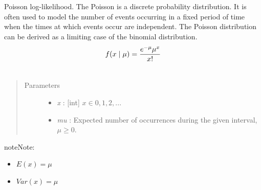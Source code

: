 \documentclass[letterpaper,10pt,english]{sphinxmanual}
\begin{document}
\begin{fulllineitems}
\label{distributions:pymc.distributions.poisson_like}
Poisson log-likelihood. The Poisson is a discrete probability
distribution.  It is often used to model the number of events
occurring in a fixed period of time when the times at which events
occur are independent. The Poisson distribution can be derived as
a limiting case of the binomial distribution.
\begin{gather}
\begin{split}f(x \mid \mu) = \frac{e^{-\mu}\mu^x}{x!}\end{split}\notag\\\begin{split}\end{split}\notag
\end{gather}\begin{quote}\begin{description}
\item[{Parameters }] \leavevmode\begin{itemize}
\item {} 
\emph{x} : {[}int{]} $x \in {0,1,2,...}$

\item {} 
\emph{mu} : Expected number of occurrences during the given interval, $\mu \geq 0$.

\end{itemize}

\end{description}\end{quote}

\begin{notice}{note}{Note:}\begin{itemize}
\item {} 
$E(x)=\mu$

\item {} 
$Var(x)=\mu$

\end{itemize}
\end{notice}

\end{fulllineitems}

\end{document}

